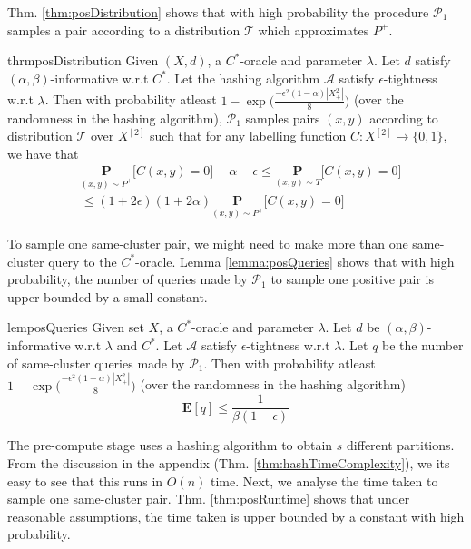 \documentclass[12pt]{article}
\newcommand{\mb}{\mathbf}
\newcommand{\mc}{\mathcal}
\begin{document}
Thm. \ref{thm:posDistribution} shows that with high probability the procedure $\mc P_{1}$ samples a pair according to a distribution $\mc T$  which approximates $P^+$. 
\begin{restatable}{thrm}{posDistribution}
\label{thm:posDistribution}
Given $(X, d)$, a $C^*$-oracle and parameter $\lambda$. Let $d$ satisfy $(\alpha, \beta)$-informative  w.r.t $C^*$. Let the hashing algorithm $\mc A$ satisfy $\epsilon$-tightness w.r.t $\lambda$. Then with probability atleast $1-\exp\big(\frac{-\epsilon^2(1-\alpha)|X^2_+|}{8}\big)$ (over the randomness in the hashing algorithm), $\mc P_{1}$ samples pairs $(x, y)$  according to distribution $\mc T$ over $X^{[2]}$ such that for any labelling function $C : X^{[2]} \rightarrow \{0, 1\}$, we have that 
\begin{align*}
  &\underset{(x, y) \sim P^+}{\mb P} \big[ C(x, y) = 0 ] -\alpha -\epsilon \le \underset{(x, y) \sim T}{\mb P} \big[ C(x, y) = 0 ] \\
  &\le  (1 + 2\epsilon)(1+2\alpha) \underset{(x, y) \sim P^+}{\mb P} \big[ C(x, y) = 0 ]
\end{align*} 
\end{restatable}

To sample one same-cluster pair, we might need to make more than one same-cluster query to the $C^*$-oracle. Lemma \ref{lemma:posQueries} shows that with high probability, the number of queries made by $\mc P_{1}$ to sample one positive pair is upper bounded by a small constant. 

\begin{restatable}{lem}{posQueries}
\label{lemma:posQueries}
Given set $X$, a $C^*$-oracle and parameter $\lambda$. Let $d$ be $(\alpha, \beta)$-informative w.r.t $\lambda$ and $C^*$. Let $\mc A$ satisfy $\epsilon$-tightness w.r.t $\lambda$. Let $q$ be the number of same-cluster queries made by $\mc P_1$. Then with probability atleast $1-\exp\big(\frac{-\epsilon^2(1-\alpha)|X^2_+|}{8}\big)$ (over the randomness in the hashing algorithm) $$\mb E[q] \le \frac{1}{\beta(1-\epsilon)}$$ 
\end{restatable}

The pre-compute stage uses a hashing algorithm to obtain $s$ different partitions. From the discussion in the appendix (Thm. \ref{thm:hashTimeComplexity}), we its easy to see that this runs in $O(n)$ time. Next, we  analyse the time taken to sample one same-cluster pair.  Thm. \ref{thm:posRuntime} shows that under reasonable assumptions, the time taken is upper bounded by a constant with high probability. 
\end{document}
